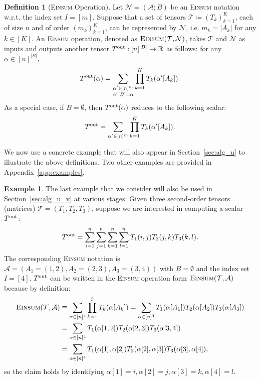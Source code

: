 \documentclass[12pt]{article}
\theoremstyle{plain}
\theoremstyle{definition}
\newtheorem{definition}{Definition}
\newtheorem{example}{Example}
\def\Einsum{\textsc{Einsum}}
\newcommand{\tensorcontraction}{\textsc{Einsum}}
\newcommand{\reals}{{\mathbb{R}}}
\def\calA{\mathcal{A}}
\def\calT{\mathcal{T}}
\def\calN{\mathcal{N}}
\begin{document}
\begin{bibunit}[agsm]
\begin{definition}[\Einsum{} Operation]
\label{def:tensor_contraction}  
Let $\calN = (\calA; B)$ be an \Einsum{} notation w.r.t. the index set $I = [m]$. Suppose that a set of tensors $\calT \coloneqq (T_k)_{k=1}^K$, each of size $n$ and of order $(m_k)_{k = 1}^{K}$, can be represented by $\calN$, i.e. $m_k = |A_k|$ for any $k \in [K]$. An \Einsum{} operation, denoted as $\tensorcontraction(\calT, \calN)$, takes $\calT$ and $\calN$ as inputs and outputs another tensor $T^{\rm out}: [n]^{|B|} \rightarrow \reals$ as follows: for any $\alpha \in [n]^{|B|}$, 
   \begin{align*}
        T^{\rm out} (\alpha) = \sum_{\substack{\alpha^\prime \in [n]^m \\ \alpha'[B] = \alpha}} \prod_{k=1}^K T_k(\alpha^\prime[A_k]).
    \end{align*} 
As a special case, if $B = \emptyset$, then $T^{\rm out} (\alpha)$ reduces to the following scalar:
\begin{align*}
    T^{\rm out} = \sum_{\alpha^\prime \in [n]^m}\prod_{k=1}^K T_k(\alpha^\prime[A_k]).
\end{align*}
\end{definition}

We now use a concrete example that will also appear in Section~\ref{sec:alg_u} to illustrate the above definitions. Two other examples are provided in Appendix~\ref{app:examples}.

\begin{example}
\label{eg:running}
The last example that we consider will also be used in Section~\ref{sec:alg_u_v} at various stages. Given three second-order tensors (matrices) $\calT = (T_1, T_2, T_3)$, suppose we are interested in computing a scalar $T^{\rm out}$:
\begin{align*}
T^{\rm out} = \sum_{i = 1}^{n} \sum_{j = 1}^{n} \sum_{k = 1}^{n} \sum_{l = 1}^{n} T_1 (i, j) T_2 (j, k) T_3 (k, l).
\end{align*}
The corresponding \Einsum{} notation is $\calA = (A_1 = (1, 2), A_2 = (2, 3), A_3 = (3, 4))$ with $B = \emptyset$ and the index set $I = [4]$. $T^{\rm out}$ can be written in the \Einsum{} operation form $\tensorcontraction(\calT, \calA)$ because by definition:
\begin{align*}
\tensorcontraction(\calT, \calA) & \equiv \sum_{\alpha \in [n]^{4}} \prod_{k = 1}^{3} T_{k} (\alpha [A_k]) = \sum_{\alpha \in [n]^{4}} T_1 (\alpha [A_1]) T_2 (\alpha [A_2]) T_3 (\alpha [A_3]) \\
& = \sum_{\alpha \in [n]^{4}} T_1 (\alpha[1, 2]) T_2 (\alpha[2, 3]) T_3 (\alpha[3, 4]) \\
& = \sum_{\alpha \in [n]^{4}} T_1 (\alpha[1], \alpha[2]) T_2 (\alpha[2], \alpha[3]) T_3 (\alpha[3], \alpha[4]),
\end{align*}
so the claim holds by identifying $\alpha [1] = i, \alpha [2] = j, \alpha [3] = k, \alpha [4] = l$.
\end{example}


\end{bibunit}
\end{document}
